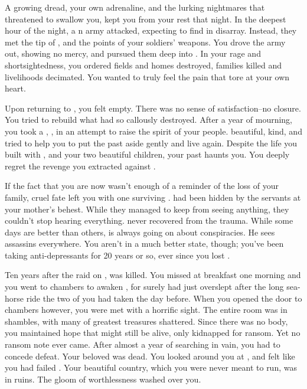 \documentclass[char]{NeptuneBall}
\begin{document}
A growing dread, your own adrenaline, and the lurking nightmares that threatened to swallow you, kept you from your rest that night. In the deepest hour of the night, a \pPacifica{}n army attacked, expecting to find \pAtlantis{} in disarray. Instead, they met the tip of \iTrident{\MYname{}}, and the points of your soldiers' weapons. You drove the army out, showing no mercy, and pursued them deep into \pPacifica{}. In your rage and shortsightedness, you ordered fields and homes destroyed, families killed and livelihoods decimated. You wanted \pPacifica{} to truly feel the pain that tore at your own heart.

Upon returning to \pAtlantis{}, you felt empty. There was no sense of satisfaction--no closure. You tried to rebuild what \pPacifica{} had so callously destroyed. After a year of mourning, you took a \cQueen{\spouse{}}, \cQueen{\King{}} \cQueen{}, in an attempt to raise the spirit of your people. \cQueen{\They{}} \cQueen{\were} beautiful, kind, and tried to help you to put the past aside gently and live again. Despite the life you built with \cQueen{}, and your two beautiful children, your past haunts you. You deeply regret the revenge you extracted against \pPacifica{}. 

If the fact that you are now \cKing{\King} wasn't enough of a reminder of the loss of your family, cruel fate left you with one surviving \cPlant{\sibling}. \cPlant{} had been hidden by the servants at your mother's behest.  While they managed to keep \cPlant{\them} from seeing anything, they couldn't stop \cPlant{\them} hearing everything. \cPlant{} never recovered from the trauma.  While some days are better than others, \cPlant{} is always going on about conspiracies. He sees assassins everywhere.  You aren't in a much better state, though; you've been taking anti-depressants for 20 years or so, ever since you lost \cQueen{}. 

Ten years after the raid on \pPacifica{}, \cQueen{} was killed. You missed \cQueen{\them} at breakfast one morning and you went to \cQueen{\their} chambers to awaken \cQueen{\them}, for surely \cQueen{\they} had just overslept after the long sea-horse ride the two of you had taken the day before. When you opened the door to \cQueen{\their} chambers however, you were met with a horrific sight. The entire room was in shambles, with many of \cQueen{\their} greatest treasures shattered. Since there was no body, you maintained hope that \cQueen{\they} might still be alive, only kidnapped for ransom. Yet no ransom note ever came. After almost a year of searching in vain, you had to concede defeat. Your beloved \cQueen{} was dead. You looked around you at \pAtlantis{}, and felt like you had failed \cQueen{\them}. Your beautiful country, which you were never meant to run, was in ruins. The gloom of worthlessness washed over you.
\end{document}
